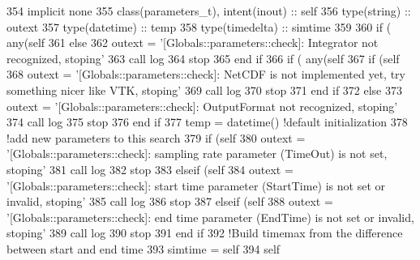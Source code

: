 \begin{DoxyCode}
354     \textcolor{keywordtype}{implicit none}
355     \textcolor{keywordtype}{class}(parameters\_t), \textcolor{keywordtype}{intent(inout)} :: self
356     \textcolor{keywordtype}{type}(string) :: outext
357     \textcolor{keywordtype}{type}(datetime) :: temp
358     \textcolor{keywordtype}{type}(timedelta) :: simtime
359 
360     \textcolor{keywordflow}{if} ( any(self%
361     \textcolor{keywordflow}{else}
362         outext = \textcolor{stringliteral}{'[Globals::parameters::check]: Integrator not recognized, stoping'}
363         \textcolor{keyword}{call }log%
364         stop
365 \textcolor{keywordflow}{    end if}
366     \textcolor{keywordflow}{if} ( any(self%
367         \textcolor{keywordflow}{if} (self%
368             outext = \textcolor{stringliteral}{'[Globals::parameters::check]: NetCDF is not implemented yet, try something nicer like
       VTK, stoping'}
369             \textcolor{keyword}{call }log%
370             stop
371 \textcolor{keywordflow}{        end if}
372     \textcolor{keywordflow}{else}
373         outext = \textcolor{stringliteral}{'[Globals::parameters::check]: OutputFormat not recognized, stoping'}
374         \textcolor{keyword}{call }log%
375         stop
376 \textcolor{keywordflow}{    end if}
377     temp = datetime() \textcolor{comment}{!default initialization}
378     \textcolor{comment}{!add new parameters to this search}
379     \textcolor{keywordflow}{if} (self%
380         outext = \textcolor{stringliteral}{'[Globals::parameters::check]: sampling rate parameter (TimeOut) is not set, stoping'}
381         \textcolor{keyword}{call }log%
382         stop
383     \textcolor{keywordflow}{elseif} (self%
384         outext = \textcolor{stringliteral}{'[Globals::parameters::check]: start time parameter (StartTime) is not set or invalid,
       stoping'}
385         \textcolor{keyword}{call }log%
386         stop
387     \textcolor{keywordflow}{elseif} (self%
388         outext = \textcolor{stringliteral}{'[Globals::parameters::check]: end time parameter (EndTime) is not set or invalid,
       stoping'}
389         \textcolor{keyword}{call }log%
390         stop
391 \textcolor{keywordflow}{    end if}
392     \textcolor{comment}{!Build timemax from the difference between start and end time}
393     simtime = self%
394     self%
\end{DoxyCode}
\mbox{\label{namespacesimulation__globals__mod_a7caca00d4eeb93c4120f0a8b27dda478}} 
